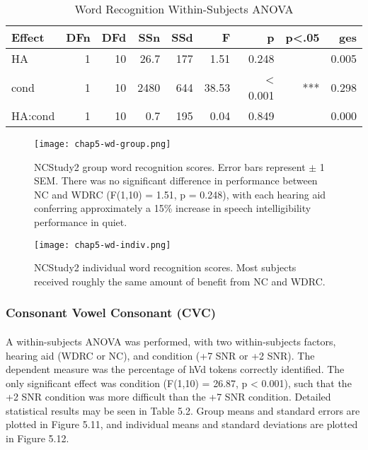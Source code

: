 \begin{table}[htp]
\begin{center}
\begin{tabular}{lrrrrrrrr}
Effect & DFn & DFd & SSn & SSd & F & p & p<.05 & ges \\
\hline
          HA &  1 & 10 & 26.7 & 177 &  1.51 & 0.248  &   &  0.005 \\
        cond &  1 & 10 & 2480 & 644 & 38.53 & < 0.001  &   *** & 0.298 \\
     HA:cond &  1 & 10 & 0.7 & 195 &  0.04 & 0.849  &     & 0.000 \\
\hline
\end{tabular}
\end{center}
\caption{Word Recognition Within-Subjects ANOVA}
\end{table}

\begin{figure}[htp]
\begin{center}
\texttt{[image: chap5-wd-group.png]} \\
\caption[NCStudy2 group word recognition scores]{NCStudy2 group word recognition scores.  Error bars represent $\pm$ 1 SEM.  There was no significant difference in performance between NC and WDRC (F(1,10) = 1.51, p = 0.248), with each hearing aid conferring approximately a 15\% increase in speech intelligibility performance in quiet.}
\label{ch5-wd-group}
\end{center}
\end{figure}

\begin{figure}[htp]
\begin{center}
\texttt{[image: chap5-wd-indiv.png]} \\
\caption[NCStudy2 individual word recognition scores]{NCStudy2 individual word recognition scores.  Most subjects received roughly the same amount of benefit from NC and WDRC.}
\label{ch5-wd-indiv}
\end{center}
\end{figure}

\subsubsection{Consonant Vowel Consonant (CVC)}
\paragraph{}A within-subjects ANOVA was performed, with two within-subjects factors, hearing aid (WDRC or NC), and condition (+7 SNR or +2 SNR).  The dependent measure was the percentage of hVd tokens correctly identified.  The only significant effect was condition (F(1,10) = 26.87, p < 0.001), such that the +2 SNR condition was more difficult than the +7 SNR condition.  Detailed statistical results may be seen in Table 5.2.  Group means and standard errors are plotted in Figure 5.11, and individual means and standard deviations are plotted in Figure 5.12.

